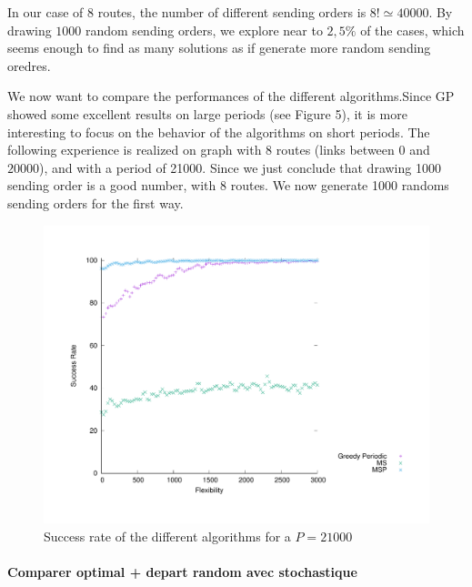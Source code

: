 \documentclass[a4paper,10pt]{article}
\begin{document}
     In our case of 8 routes, the number of different sending orders is $8! \simeq 40 000$. By drawing $1000$ random sending orders, we explore near to $2,5 \%$ of the cases, which seems enough to find as many solutions as if generate more random sending oredres.


     
     We now want to compare the performances of the different algorithms.Since GP showed some excellent results on large periods (see Figure 5), it is more interesting to focus on the behavior of the algorithms on short periods. The following experience is realized on graph with 8 routes (links between $0$ and $20000$), and with a period of 21000. Since we just conclude that drawing 1000 sending order is a good number, with 8 routes. We now generate 1000 randoms sending orders for the first way.
    

 
    \begin{figure}

       \begin{center}
      \includegraphics[scale=0.4]{retour_21000.pdf}
      \end{center}
      \caption{Success rate of the different algorithms for a $P = 21000$}
     \end{figure}
     
     
    
    \paragraph{Comparer optimal + depart random avec stochastique}
    
\end{document}
